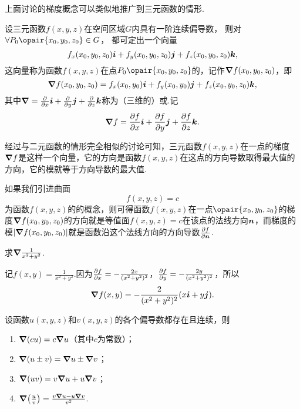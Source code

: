 上面讨论的梯度概念可以类似地推广到三元函数的情形.
\begin{definition}
设三元函数\(f(x,y,z)\)在空间区域\(G\)内具有一阶连续偏导数，%
则对\(\forall P_0\opair{x_0,y_0,z_0} \in G\)，%
都可定出一个向量\[
f_x(x_0,y_0,z_0) \boldsymbol{i} + f_y(x_0,y_0,z_0) \boldsymbol{j} + f_z(x_0,y_0,z_0) \boldsymbol{k},
\]这向量称为函数\(f(x,y,z)\)在点\(P_0\opair{x_0,y_0,z_0}\)的，记作\(\grad{f}(x_0,y_0,z_0)\)，即\[
\grad{f}(x_0,y_0,z_0)
= f_x(x_0,y_0) \boldsymbol{i} + f_y(x_0,y_0) \boldsymbol{j} + f_z(x_0,y_0,z_0) \boldsymbol{k},
\]其中\(\grad = \pdv{x} \boldsymbol{i} + \pdv{y} \boldsymbol{j} + \pdv{z} \boldsymbol{k}\)称为（三维的）或.记\[
\grad{f} = \pdv{f}{x} \boldsymbol{i} + \pdv{f}{y} \boldsymbol{j} + \pdv{f}{z} \boldsymbol{k}.
\]
\end{definition}

经过与二元函数的情形完全相似的讨论可知，三元函数\(f(x,y,z)\)在一点的梯度\(\grad{f}\)是这样一个向量，它的方向是函数\(f(x,y,z)\)在这点的方向导数取得最大值的方向，它的模就等于方向导数的最大值.

如果我们引进曲面\[
f(x,y,z) = c
\]为函数\(f(x,y,z)\)的的概念，则可得函数\(f(x,y,z)\)在一点\(\opair{x_0,y_0,z_0}\)的梯度\(\grad f(x_0,y_0,z_0)\)的方向就是等值面\(f(x,y,z) = c\)在该点的法线方向\(\boldsymbol{n}\)，而梯度的模\(\abs{\grad f(x_0,y_0,z_0)}\)就是函数沿这个法线方向的方向导数\(\pdv{f}{\boldsymbol{n}}\).

\begin{example}
求\(\grad \frac{1}{x^2+y^2}\).
\begin{solution}
记\(f(x,y) = \frac{1}{x^2+y^2}\).因为\(\pdv{f}{x} = -\frac{2x}{(x^2+y^2)^2}\)，\(\pdv{f}{y} = -\frac{2y}{(x^2+y^2)^2}\)，所以\[
\grad f(x,y) = -\frac{2}{(x^2+y^2)^2} (x \boldsymbol{i} + y \boldsymbol{j}).
\]
\end{solution}
\end{example}

\begin{theorem}\label{theorem:多元函数微分法.梯度的运算法则}
设函数\(u(x,y,z)\)和\(v(x,y,z)\)的各个偏导数都存在且连续，则\begin{enumerate}
\item \(\grad(c u) = c \grad u\)（其中\(c\)为常数）；
\item \(\grad(u \pm v) = \grad u \pm \grad v\)；
\item \(\grad(uv) = v \grad u + u \grad v\)；
\item \(\grad(\frac{u}{v}) = \frac{v \grad u - u \grad v}{v^2}\).
\end{enumerate}
\end{theorem}

